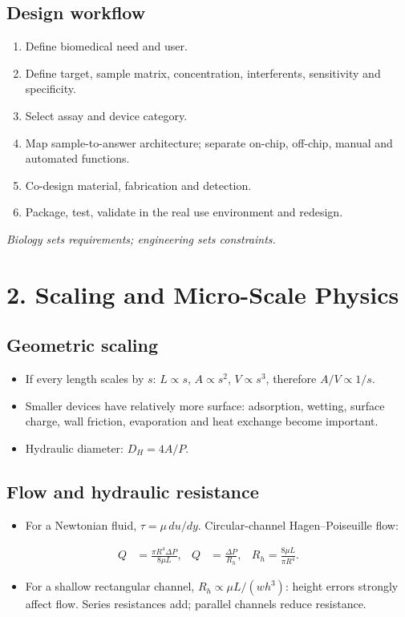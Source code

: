 \documentclass[10pt,a4paper]{ctexart}
\newcommand{\formula}[1]{%
	\par\vspace{1pt}\begingroup
	\setlength{\abovedisplayskip}{0pt}\setlength{\belowdisplayskip}{0pt}
	\[ #1 \]\endgroup\vspace{1pt}}
\begin{document}
\begin{multicols*}{2}
\subsection{Design workflow}
\begin{enumerate}
	\item Define biomedical need and user.
	\item Define target, sample matrix, concentration, interferents, sensitivity and specificity.
	\item Select assay and device category.
	\item Map sample-to-answer architecture; separate on-chip, off-chip, manual and automated functions.
	\item Co-design material, fabrication and detection.
	\item Package, test, validate in the real use environment and redesign.
\end{enumerate}
\textit{Biology sets requirements; engineering sets constraints.}


\section{2. Scaling and Micro-Scale Physics}
\subsection{Geometric scaling}
\begin{itemize}
	\item If every length scales by \(s\): \(L\propto s\), \(A\propto s^2\), \(V\propto s^3\), therefore \(A/V\propto1/s\).
	\item Smaller devices have relatively more surface: adsorption, wetting, surface charge, wall friction, evaporation and heat exchange become important.
	\item Hydraulic diameter: \(D_H=4A/P\).
\end{itemize}

\subsection{Flow and hydraulic resistance}
\begin{itemize}
	\item For a Newtonian fluid, \(\tau=\mu\,du/dy\). Circular-channel Hagen--Poiseuille flow:
\end{itemize}
\formula{\begin{aligned}
Q&=\frac{\pi R^4\Delta P}{8\mu L},& Q&=\frac{\Delta P}{R_h}, &R_h=\frac{8\mu L}{\pi R^4}.
\end{aligned}}
\begin{itemize}
	\item For a shallow rectangular channel, \(R_h\propto\mu L/(wh^3)\): height errors strongly affect flow. 
	Series resistances add; parallel channels reduce resistance.
\end{itemize}


\end{multicols*}
\end{document}
